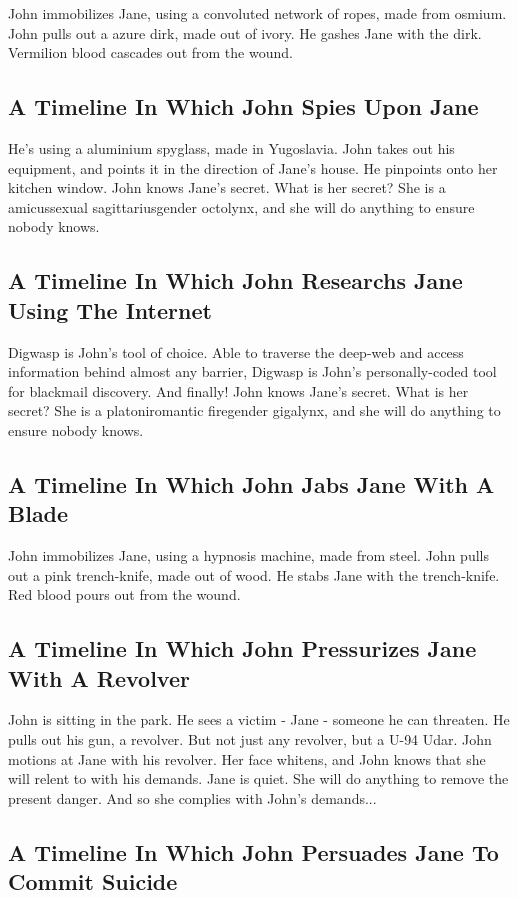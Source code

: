 \documentclass{article}
\begin{document}
John immobilizes Jane, using a convoluted network of ropes, made from osmium.
John pulls out a azure dirk, made out of ivory.
He gashes Jane with the dirk.
Vermilion blood cascades out from the wound.
\subsection{A Timeline In Which John Spies Upon Jane}


He's using a aluminium spyglass, made in Yugoslavia.
John takes out his equipment, and points it in the direction of Jane's house. He pinpoints onto her kitchen window.
John knows Jane's secret. What is her secret? She is a amicussexual sagittariusgender octolynx, and she will do anything to ensure nobody knows.
\subsection{A Timeline In Which John Researchs Jane Using The Internet}


Digwasp is John's tool of choice. Able to traverse the deep{-}web and access information behind almost any barrier, Digwasp is John's personally{-}coded tool for blackmail discovery.
And finally!
John knows Jane's secret. What is her secret? She is a platoniromantic firegender gigalynx, and she will do anything to ensure nobody knows.
\subsection{A Timeline In Which John Jabs Jane With A Blade}


John immobilizes Jane, using a hypnosis machine, made from steel.
John pulls out a pink trench{-}knife, made out of wood.
He stabs Jane with the trench{-}knife.
Red blood pours out from the wound.
\subsection{A Timeline In Which John Pressurizes Jane With A Revolver}


John is sitting in the park.
He sees a victim {-} Jane {-} someone he can threaten. He pulls out his gun, a revolver.
But not just any revolver, but a U{-}94 Udar.
John motions at Jane with his revolver. Her face whitens, and John knows that she will relent to with his demands.
Jane is quiet. She will do anything to remove the present danger. And so she complies with John's demands...
\subsection{A Timeline In Which John Persuades Jane To Commit Suicide}
\end{document}
